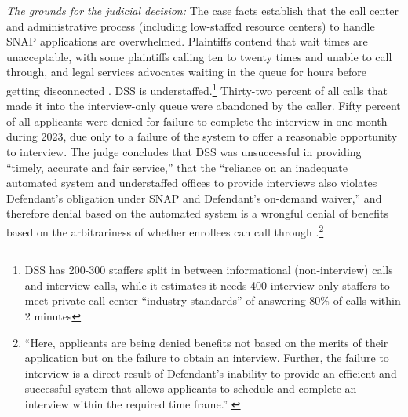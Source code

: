 \documentclass[manuscript,screen,authorversion]{acmart}
\begin{document}
\textit{The grounds for the judicial decision:} 
The case facts establish that the call center and administrative process (including low-staffed resource centers) to handle SNAP applications are overwhelmed. Plaintiffs contend that wait times are unacceptable, with some plaintiffs calling ten to twenty times and unable to call through, and legal services advocates waiting in the queue for hours before getting disconnected \citep{holmesKnodellPlaintiffsMSJ2024}. DSS is understaffed.\footnote{DSS has 200-300 staffers split in between informational (non-interview) calls and interview calls, while it estimates it needs 400 interview-only staffers to meet private call center “industry standards” of answering 80\% of calls within 2 minutes} Thirty-two percent of all calls that made it into the interview-only queue were abandoned by the caller. Fifty percent of all applicants were denied for failure to complete the interview in one month during 2023, due only to a failure of the system to offer a reasonable opportunity to interview. %
The judge concludes that DSS was unsuccessful in providing ``timely, accurate and fair service,'' that the ``reliance on an inadequate automated system and understaffed offices to provide interviews also violates Defendant’s obligation under SNAP and Defendant’s on-demand waiver,'' and therefore    denial based on the automated system is a wrongful denial of benefits based on the arbitrariness of whether enrollees can call through \citep{holmesKnodell2024}.\footnote{``Here, applicants are being denied benefits not based on the merits of their application but on the failure to obtain an interview. Further, the failure to interview is a direct result of Defendant's inability to provide an efficient and successful system that allows applicants to schedule and complete an interview within the required time frame.'' \citep{holmesKnodell2024}} 
\end{document}
